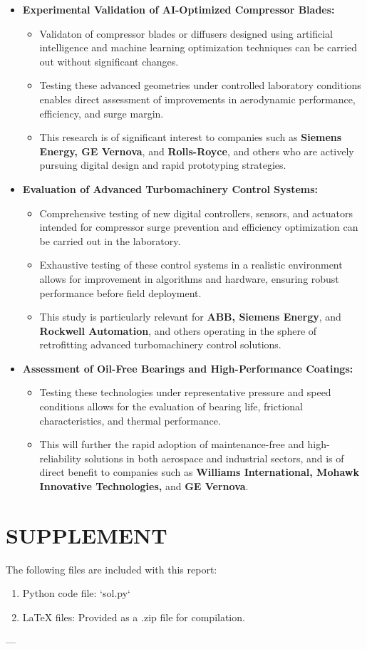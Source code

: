 \documentclass[12pt,a4paper]{article}
\begin{document}
\begin{itemize}
	\item \textbf{Experimental Validation of AI-Optimized Compressor Blades:}
	\begin{itemize}
		\item Validaton of compressor blades or diffusers designed using artificial intelligence and machine learning optimization techniques can be carried out without significant changes.
		\item Testing these advanced geometries under controlled laboratory conditions enables direct assessment of improvements in aerodynamic performance, efficiency, and surge margin.
		\item This research is of significant interest to companies such as \textbf{Siemens Energy, GE Vernova}, and \textbf{Rolls-Royce}, and others who are actively pursuing digital design and rapid prototyping strategies.
	\end{itemize}
	
	\item \textbf{Evaluation of Advanced Turbomachinery Control Systems:}
	\begin{itemize}
		\item Comprehensive testing of new digital controllers, sensors, and actuators intended for compressor surge prevention and efficiency optimization can be carried out in the laboratory.
		\item Exhaustive testing of these control systems in a realistic environment allows for  improvement in algorithms and hardware, ensuring robust performance before field deployment.
		\item This study is particularly relevant for \textbf{ABB, Siemens Energy}, and \textbf{Rockwell Automation}, and others operating in the sphere of retrofitting advanced turbomachinery control solutions.
	\end{itemize}
	
	\item \textbf{Assessment of Oil-Free Bearings and High-Performance Coatings:}
	\begin{itemize}
		\item Testing these technologies under representative pressure and speed conditions allows for the evaluation of bearing life, frictional characteristics, and thermal performance.
		\item This will further the rapid adoption of maintenance-free and high-reliability solutions in both aerospace and industrial sectors, and is of direct benefit to companies such as \textbf{Williams International, Mohawk Innovative Technologies,} and \textbf{GE Vernova}.
	\end{itemize}
\end{itemize}
	\section*{SUPPLEMENT}
	The following files are included with this report:
	\begin{enumerate}
		\item Python code file: `sol.py`
		\item LaTeX files: Provided as a .zip file for compilation.
	\end{enumerate}
	
	---
\end{document}
